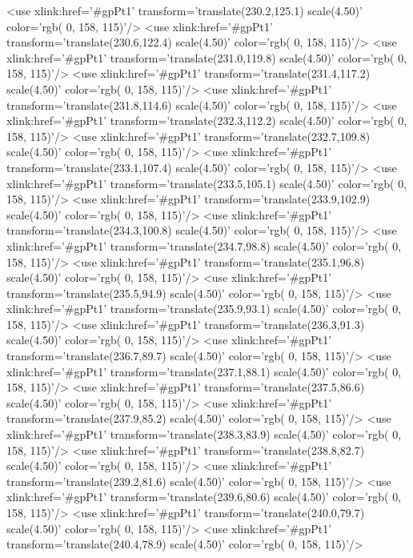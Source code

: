 	<use xlink:href='#gpPt1' transform='translate(230.2,125.1) scale(4.50)' color='rgb(  0, 158, 115)'/>
	<use xlink:href='#gpPt1' transform='translate(230.6,122.4) scale(4.50)' color='rgb(  0, 158, 115)'/>
	<use xlink:href='#gpPt1' transform='translate(231.0,119.8) scale(4.50)' color='rgb(  0, 158, 115)'/>
	<use xlink:href='#gpPt1' transform='translate(231.4,117.2) scale(4.50)' color='rgb(  0, 158, 115)'/>
	<use xlink:href='#gpPt1' transform='translate(231.8,114.6) scale(4.50)' color='rgb(  0, 158, 115)'/>
	<use xlink:href='#gpPt1' transform='translate(232.3,112.2) scale(4.50)' color='rgb(  0, 158, 115)'/>
	<use xlink:href='#gpPt1' transform='translate(232.7,109.8) scale(4.50)' color='rgb(  0, 158, 115)'/>
	<use xlink:href='#gpPt1' transform='translate(233.1,107.4) scale(4.50)' color='rgb(  0, 158, 115)'/>
	<use xlink:href='#gpPt1' transform='translate(233.5,105.1) scale(4.50)' color='rgb(  0, 158, 115)'/>
	<use xlink:href='#gpPt1' transform='translate(233.9,102.9) scale(4.50)' color='rgb(  0, 158, 115)'/>
	<use xlink:href='#gpPt1' transform='translate(234.3,100.8) scale(4.50)' color='rgb(  0, 158, 115)'/>
	<use xlink:href='#gpPt1' transform='translate(234.7,98.8) scale(4.50)' color='rgb(  0, 158, 115)'/>
	<use xlink:href='#gpPt1' transform='translate(235.1,96.8) scale(4.50)' color='rgb(  0, 158, 115)'/>
	<use xlink:href='#gpPt1' transform='translate(235.5,94.9) scale(4.50)' color='rgb(  0, 158, 115)'/>
	<use xlink:href='#gpPt1' transform='translate(235.9,93.1) scale(4.50)' color='rgb(  0, 158, 115)'/>
	<use xlink:href='#gpPt1' transform='translate(236.3,91.3) scale(4.50)' color='rgb(  0, 158, 115)'/>
	<use xlink:href='#gpPt1' transform='translate(236.7,89.7) scale(4.50)' color='rgb(  0, 158, 115)'/>
	<use xlink:href='#gpPt1' transform='translate(237.1,88.1) scale(4.50)' color='rgb(  0, 158, 115)'/>
	<use xlink:href='#gpPt1' transform='translate(237.5,86.6) scale(4.50)' color='rgb(  0, 158, 115)'/>
	<use xlink:href='#gpPt1' transform='translate(237.9,85.2) scale(4.50)' color='rgb(  0, 158, 115)'/>
	<use xlink:href='#gpPt1' transform='translate(238.3,83.9) scale(4.50)' color='rgb(  0, 158, 115)'/>
	<use xlink:href='#gpPt1' transform='translate(238.8,82.7) scale(4.50)' color='rgb(  0, 158, 115)'/>
	<use xlink:href='#gpPt1' transform='translate(239.2,81.6) scale(4.50)' color='rgb(  0, 158, 115)'/>
	<use xlink:href='#gpPt1' transform='translate(239.6,80.6) scale(4.50)' color='rgb(  0, 158, 115)'/>
	<use xlink:href='#gpPt1' transform='translate(240.0,79.7) scale(4.50)' color='rgb(  0, 158, 115)'/>
	<use xlink:href='#gpPt1' transform='translate(240.4,78.9) scale(4.50)' color='rgb(  0, 158, 115)'/>
